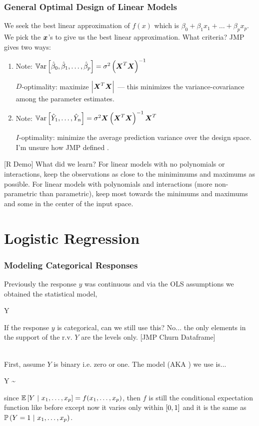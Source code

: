 \documentclass[handout]{beamer}
\begin{document}
\begin{frame}\frametitle{General Optimal Design of Linear Models}
\small

We seek the best linear approximation of $f(x)$ which is $\beta_0 + \beta_1 x _1+ \ldots + \beta_p x_p$. We pick the $\boldsymbol{x}$'s to give us the best linear approximation. What criteria? JMP gives two ways:

\begin{enumerate}
\item Note: $\mathbb{V}\text{ar}\left[\hat{\beta}_0, \hat{\beta}_1, \ldots, \hat{\beta}_p\right] = \sigma^2 \left(\boldsymbol{X}^T\boldsymbol{X}\right)^{-1}$ \pause

$D$-optimality: maximize $\left|\boldsymbol{X}^T\boldsymbol{X}\right|$ --- this minimizes the variance-covariance among the parameter estimates. \pause

\item Note: $\mathbb{V}\text{ar}\left[\hat{Y}_1, \ldots, \hat{Y}_n\right] = \sigma^2 \boldsymbol{X}\left(\boldsymbol{X}^T\boldsymbol{X}\right)^{-1}\boldsymbol{X}^T$ \pause 

$I$-optimality: minimize the average prediction variance over the design space. I'm unsure how JMP defined .
\end{enumerate}

[R Demo] \pause What did we learn? \pause For linear models with no polynomials or interactions, keep the observations as close to the minimimums and maximums as possible. For linear models with polynomials and interactions (more non-parametric than parametric), \pause keep most towards the minimums and maximums and some in the center of the input space.

\end{frame}



\section{Logistic Regression}


\begin{frame}\frametitle{Modeling Categorical Responses}

Previously the response $y$ was continuous and via the OLS assumptions we obtained the statistical model,

\beqn
Y \inddist {}
\eeqn

If the response $y$ is categorical, can we still use this? \pause No... the only elements in the support of the r.v. $Y$ are the levels only. [JMP Churn Dataframe] \\~\\ \pause 

First, assume $Y$ is binary i.e. zero or one. The model (AKA ) we use is...\pause  

\beqn
Y \sim {}
\eeqn

since $\mathbb{E}\left[Y~|~x_1, \ldots, x_p\right] = f(x_1, \ldots, x_p)$, then $f$ is still the conditional expectation function like before except now it varies only within \pause $\left[0,1\right]$ and it is the same as \pause   $\mathbb{P}\left(Y = 1~|~x_1, \ldots, x_p\right)$.

\end{frame}
\end{document}
